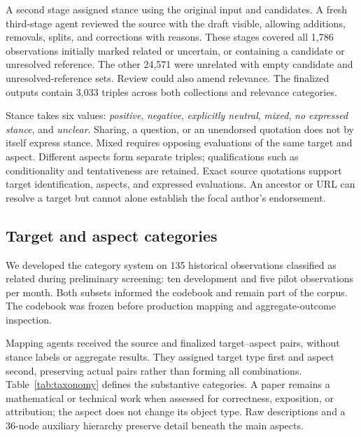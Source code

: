 \documentclass[sigconf,balance=false]{acmart}
\begin{document}
A second stage assigned stance using the original input and candidates. A fresh third-stage agent reviewed the source with the draft visible, allowing additions, removals, splits, and corrections with reasons. These stages covered all 1,786 observations initially marked related or uncertain, or containing a candidate or unresolved reference. The other 24,571 were unrelated with empty candidate and unresolved-reference sets. Review could also amend relevance. The finalized outputs contain 3,033 triples across both collections and relevance categories.

Stance takes six values: \emph{positive}, \emph{negative}, \emph{explicitly neutral}, \emph{mixed}, \emph{no expressed stance}, and \emph{unclear}. Sharing, a question, or an unendorsed quotation does not by itself express stance. Mixed requires opposing evaluations of the same target and aspect. Different aspects form separate triples; qualifications such as conditionality and tentativeness are retained. Exact source quotations support target identification, aspects, and expressed evaluations. An ancestor or URL can resolve a target but cannot alone establish the focal author's endorsement.

\subsection{Target and aspect categories}\label{sec:categories}
We developed the category system on 135 historical observations classified as related during preliminary screening: ten development and five pilot observations per month. Both subsets informed the codebook and remain part of the corpus. The codebook was frozen before production mapping and aggregate-outcome inspection.

Mapping agents received the source and finalized target--aspect pairs, without stance labels or aggregate results. They assigned target type first and aspect second, preserving actual pairs rather than forming all combinations. Table~\ref{tab:taxonomy} defines the substantive categories. A paper remains a mathematical or technical work when assessed for correctness, exposition, or attribution; the aspect does not change its object type. Raw descriptions and a 36-node auxiliary hierarchy preserve detail beneath the main aspects.
\end{document}
